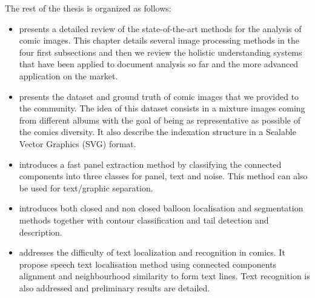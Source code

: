 The rest of the thesis is organized as follows:
\begin{itemize}
\item {} presents a detailed review of the state-of-the-art methods for the analysis of comic images. This chapter details several image processing methods in the four first subsections and then we review the holistic understanding systems that have been applied to document analysis so far and the more advanced application on the market.

\item {} presents the dataset and ground truth of comic images that we provided to the community. The idea of this dataset consists in a mixture images coming from different albums with the goal of being as representative as possible of the comics diversity.
It also describe the indexation structure in a Scalable Vector Graphics (SVG) format.

\item {} introduces a fast panel extraction method by classifying the connected components into three classes for panel, text and noise.
This method can also be used for text/graphic separation.   %

\item {} introduces both closed and non closed balloon localisation and segmentation methods together with contour classification and tail detection and description. %

\item {} addresses the difficulty of text localization and recognition in comics.
It propose speech text localisation method using connected components alignment and neighbourhood similarity to form text lines.
Text recognition is also addressed and preliminary results are detailed. %


\end{itemize}
